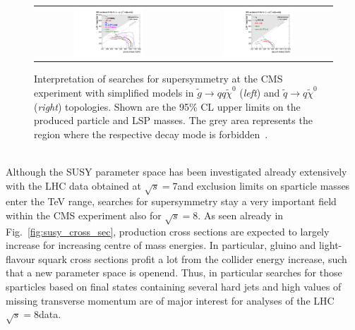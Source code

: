 \begin{figure}[!tp]
  \centering 
  \begin{tabular}{cc}
    \includegraphics[width=0.49\textwidth]{figures/T1_7TeV.pdf} &
    \includegraphics[width=0.49\textwidth]{figures/T2_7TeV.pdf}
  \end{tabular}
  \caption{Interpretation of searches for supersymmetry at the CMS experiment with simplified models in $\tilde{g} \rightarrow qq\tilde{\chi}^0$ (\textit{left}) and $\tilde{q} \rightarrow q \tilde{\chi}^0$ (\textit{right}) topologies. Shown are the 95\% CL upper limits on the produced particle and LSP masses. The grey area represents the region where the respective decay mode is forbidden~\cite{Chatrchyan:2013sza}.}
  \label{fig:SMS_7TeV}
\end{figure}
\\
Although the SUSY parameter space has been investigated already extensively with the LHC data obtained at $\sqrt{s} = 7$\tev and exclusion limits on sparticle masses enter the TeV range, searches for supersymmetry stay a very important field within the CMS experiment also for $\sqrt{s} = 8$\tev. As seen already in Fig.~\ref{fig:susy_cross_sec}, production cross sections are expected to largely increase for increasing centre of mass energies. In particular, gluino and light-flavour squark cross sections profit a lot from the collider energy increase, such that a new parameter space is openend. Thus, in particular searches for those sparticles based on final states containing several hard jets and high values of missing transverse momentum are of major interest for analyses of the LHC $\sqrt{s} = 8$\tev data.   






